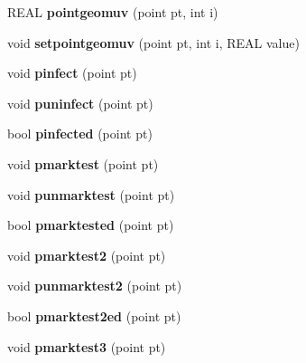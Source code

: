 \begin{DoxyCompactItemize}
\item 
\mbox{\label{classtetgenmesh_ad9b42ae25336d5ecb21577fe072a54a0}} 
R\+E\+AL {\bfseries pointgeomuv} (point pt, int i)
\item 
\mbox{\label{classtetgenmesh_a9bf2266e82ad2f2faf77f6b502e8ba1d}} 
void {\bfseries setpointgeomuv} (point pt, int i, R\+E\+AL value)
\item 
\mbox{\label{classtetgenmesh_a3da09b1723336c0d9e82677f8f30c965}} 
void {\bfseries pinfect} (point pt)
\item 
\mbox{\label{classtetgenmesh_a6220e341248cd83ab6ee1c0d71e4d160}} 
void {\bfseries puninfect} (point pt)
\item 
\mbox{\label{classtetgenmesh_acc0db186d69dcdf785b49d6e709fed7b}} 
bool {\bfseries pinfected} (point pt)
\item 
\mbox{\label{classtetgenmesh_a7f5f5b3321dcc8cb4f7852fd63688043}} 
void {\bfseries pmarktest} (point pt)
\item 
\mbox{\label{classtetgenmesh_af01c7d8e906de52fb5e8622d5a8dfb15}} 
void {\bfseries punmarktest} (point pt)
\item 
\mbox{\label{classtetgenmesh_ae775251add4fdb4ccf446ff12d602de9}} 
bool {\bfseries pmarktested} (point pt)
\item 
\mbox{\label{classtetgenmesh_ae99e753df9baa97bdc4363ce0215cbc3}} 
void {\bfseries pmarktest2} (point pt)
\item 
\mbox{\label{classtetgenmesh_aa4e64c4dcc39f85dfd109a274ba27085}} 
void {\bfseries punmarktest2} (point pt)
\item 
\mbox{\label{classtetgenmesh_ac75999fff09426c4c1cfbe334981bce0}} 
bool {\bfseries pmarktest2ed} (point pt)
\item 
\mbox{\label{classtetgenmesh_ab242764bd9b0d149339b585daad51bf5}} 
void {\bfseries pmarktest3} (point pt)

\end{DoxyCompactItemize}
